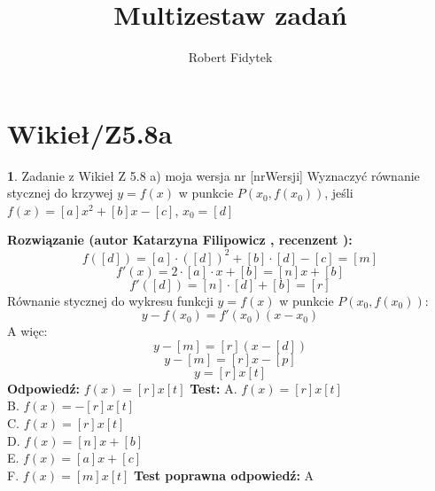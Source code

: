 \documentclass[12pt, a4paper]{article}
\title{Multizestaw zadań}
\author{Robert Fidytek}
\date{}
\theoremstyle{definition} %
\newtheorem{zad}{}
\newcommand{\kategoria}[1]{\section{#1}} %
\newcommand{\zadStart}[1]{\begin{zad}#1\newline} %
\newcommand{\zadStop}{\end{zad}}   %
\newcommand{\rozwStart}[2]{\noindent \textbf{Rozwiązanie (autor #1 , recenzent #2): }\newline} %
\newcommand{\rozwStop}{\newline}                                            %
\newcommand{\odpStart}{\noindent \textbf{Odpowiedź:}\newline}    %
\newcommand{\odpStop}{\newline}                                             %
\newcommand{\testStart}{\noindent \textbf{Test:}\newline} %
\newcommand{\testStop}{\newline} %
\newcommand{\kluczStart}{\noindent \textbf{Test poprawna odpowiedź:}\newline} %
\newcommand{\kluczStop}{\newline} %
\begin{document}
\maketitle


\kategoria{Wikieł/Z5.8a}
\zadStart{Zadanie z Wikieł Z 5.8 a) moja wersja nr [nrWersji]}
Wyznaczyć równanie stycznej do krzywej $y=f(x)$ w punkcie $P(x_0,f(x_0))$, jeśli\\
$f(x)=[a]x^2+[b]x-[c]$, $x_0=[d]$
\zadStop
\rozwStart{Katarzyna Filipowicz}{}
$$
f([d])=[a]\cdot ([d])^2+[b]\cdot[d]-[c]=[m]
$$ $$
f'(x)=2\cdot[a]\cdot x+[b]=[n]x+[b]
$$ $$
f'([d])=[n]\cdot [d]+[b]=[r]
$$
Równanie stycznej do wykresu funkcji $y=f(x)$ w punkcie $P(x_0,f(x_0))$:
$$
y-f(x_0)=f'(x_0)(x-x_0)
$$
A więc:
$$
y-[m]=[r](x-[d])
$$
$$
y-[m]=[r]x-[p]
$$ $$
y=[r]x [t]
$$
\rozwStop
\odpStart
$f(x)=[r]x [t]$
\odpStop
\testStart
A. $ f(x)=[r]x [t] $\\
B. $ f(x)=-[r]x [t]$\\
C. $ f(x)=[r]x [t]$ \\
D. $ f(x)=[n]x +[b]$\\
E. $ f(x)=[a]x+[c]$\\
F. $ f(x)=[m]x [t]$
\testStop
\kluczStart
A
\kluczStop
\end{document}
